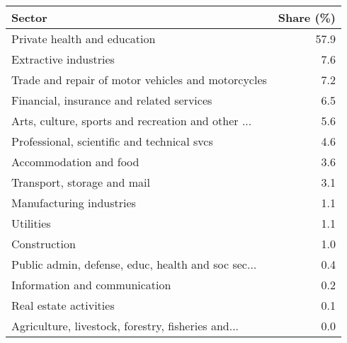 \begin{tabular}{lr}
\toprule
                                            Sector &  Share (\%) \\
\midrule
                      Private health and education &       57.9 \\
                             Extractive industries &        7.6 \\
Trade and repair of motor vehicles and motorcycles &        7.2 \\
         Financial, insurance and related services &        6.5 \\
Arts, culture, sports and recreation and other ... &        5.6 \\
       Professional, scientific and technical svcs &        4.6 \\
                            Accommodation and food &        3.6 \\
                       Transport, storage and mail &        3.1 \\
                          Manufacturing industries &        1.1 \\
                                         Utilities &        1.1 \\
                                      Construction &        1.0 \\
Public admin, defense, educ, health and soc sec... &        0.4 \\
                     Information and communication &        0.2 \\
                            Real estate activities &        0.1 \\
Agriculture, livestock, forestry, fisheries and... &        0.0 \\
\bottomrule
\end{tabular}
